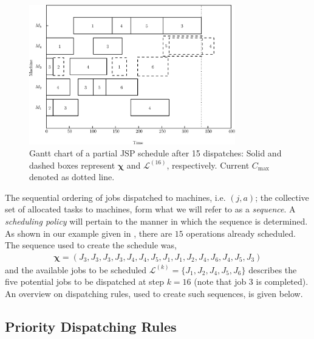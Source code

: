 \documentclass[smallextended]{svjour3}
\renewcommand{\vchi}{\bm \chi}
\begin{document}
\begin{figure}[t!]\centering
  \includegraphics[width=0.8\textwidth]{figures/jssp_example_nocolor.eps}
  \caption[Gantt chart of a partial JSP schedule]{Gantt chart of a
    partial JSP schedule after 15 dispatches: Solid and dashed boxes
    represent $\vchi$ and $\mathcal{L}^{(16)}$, respectively. Current
    $C_{\max}$ denoted as dotted line.}
  \label{fig:jssp:example}
\end{figure}
	
	
The sequential ordering of jobs dispatched to machines, i.e. $(j,a)$; the collective set of
allocated tasks to machines, form what we will refer to as a \emph{sequence}. A \emph{scheduling policy} will
pertain to the manner in which the sequence is determined.  As shown
in our example given in , there are $15$
operations already scheduled. The sequence used to create the schedule
was,
\begin{eqnarray}
  \vchi=\left(J_3,J_3,J_3,J_3,J_4,J_4,J_5,J_1,J_1,J_2,J_4,J_6,J_4,J_5,J_3\right)
\end{eqnarray}
and the available jobs to be scheduled
$\mathcal{L}^{(k)}=\{J_1,J_2,J_4,J_5,J_6\}$ describes the five potential jobs to be dispatched
at step $k=16$ (note that job 3 is completed). An overview on dispatching rules, used to create such sequences, is given below.
	
\subsection{Priority Dispatching Rules}
	
	
\end{document}
